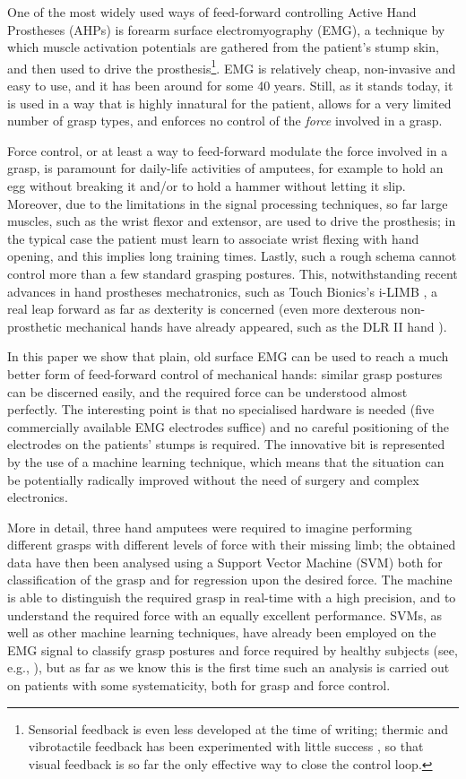 One of the most widely used ways of feed-forward controlling Active Hand
Prostheses (AHPs) is forearm surface electromyography
(EMG), a technique by which muscle activation potentials are gathered
from the patient's stump skin, and then used to drive the
prosthesis\footnote{Sensorial feedback is even less developed at the
time of writing; thermic and vibrotactile feedback has been experimented
with little success \cite{zecca}, so that visual feedback is so far the
only effective way to close the control loop.}. EMG \cite{deluca} is
relatively cheap, non-invasive and easy to use, and it has been around
for some 40 years. Still, as it stands today, it is used in a way that
is highly innatural for the patient, allows for a very limited number
of grasp types, and enforces no control of the \emph{force} involved
in a grasp. 

Force control, or at least a way to feed-forward modulate the force
involved in a grasp, is paramount for daily-life activities of amputees,
for example to hold an egg without breaking it and/or to hold a hammer
without letting it slip. Moreover, due to the limitations in the signal
processing techniques, so far large muscles, such as the wrist flexor
and extensor, are used to drive the prosthesis; in the typical case the
patient must learn to associate wrist flexing with hand opening, and this
implies long training times. Lastly, such a rough schema cannot control
more than a few standard grasping postures. This, notwithstanding recent
advances in hand prostheses mechatronics, such as Touch Bionics's i-LIMB
\cite{ilimb}, a real leap forward as far as dexterity is concerned
(even more dexterous non-prosthetic mechanical hands have already appeared,
such as the DLR II hand \cite{Hua2006}).

In this paper we show that plain, old surface EMG can be used to reach
a much better form of feed-forward control of mechanical hands: similar
grasp postures can be discerned easily, and the required force can be understood
almost perfectly. The interesting point is that no specialised hardware
is needed (five commercially available EMG electrodes suffice) and no
careful positioning of the electrodes on the patients' stumps is required.
The innovative bit is represented by the use of a machine learning technique,
which means that the situation can be potentially radically improved without
the need of surgery and complex electronics.

More in detail, three hand amputees were required to imagine performing
different grasps with different levels of force with their missing limb;
the obtained data have then been analysed using a Support Vector Machine (SVM)
both for classification of the grasp and for regression upon the desired force.
The machine is able to distinguish the required grasp in real-time with a
high precision, and to understand the required force with an equally excellent
performance. SVMs, as well as other machine learning techniques, have already been employed
on the EMG signal to classify grasp postures and force required by healthy
subjects (see, e.g., \cite{smagt,dunlop,2008.BioCyb}), but as far as we know
this is the first time such an analysis is carried out on patients with some
systematicity, both for grasp and force control.

